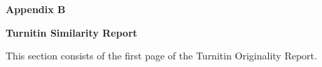 %
%
%                 
\textbf{\Huge Appendix B}
\bigskip

\textbf{\LARGE Turnitin Similarity Report}

\bigskip
This section consists of the first page of the Turnitin Originality Report.

\newpage
\setlength{\voffset}{0cm}
\setlength{\hoffset}{0cm}




